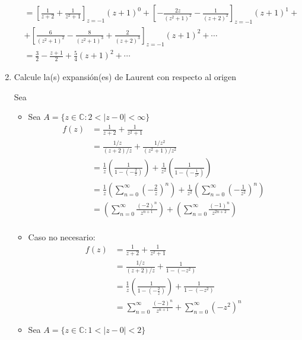 \begin{problema}
\begin{enumerate}
\begin{sol}
\begin{align*}
                &=\left[\frac{1}{z+2}+\frac{1}{z^2+1}\right]_{z=-1}(z+1)^0+\left[-\frac{2z}{(z^2+1)^2}-\frac{1}{(z+2)^2}\right]_{z=-1}(z+1)^1+\\
                &+ \left[\frac{6}{(z^2+1)^2}-\frac{8}{(z^2+1)^3}+\frac{2}{(z+2)^3}\right]_{z=-1}(z+1)^2+\cdots\\
                &= \frac{3}{2}-\frac{z+1}{2}+\frac{5}{4}(z+1)^2+\cdots
            \end{align*}
        \end{sol}
        \item Calcule la(s) expansión(es) de Laurent con respecto al origen
        \begin{sol}
            Sea 
            \begin{itemize}
                \item Sea $A=\{z\in\mathbb{C}: 2<|z-0|<\infty\}$
                 \begin{align*}
                    f(z) &= \frac{1}{z+2}+\frac{1}{z^2+1}\\
                         &= \frac{1\big/z}{(z+2)\big/ z}+\frac{1\big/z^2}{(z^2+1)\big/ z^2}\\
                         &= \frac{1}{z}\left(\frac{1}{1-\left(-\frac{2}{z}\right)}\right)+\frac{1}{z^2}\left(\frac{1}{1-\left(-\frac{1}{z^2}\right)}\right)\\
                         &=\frac{1}{z}\left(\sum_{n=0}^\infty \left(-\frac{2}{z}\right)^n\right)+\frac{1}{z^2}\left(\sum_{n=0}^\infty\left(-\frac{1}{z^2}\right)^n\right)\\
                         &= \left(\sum_{n=0}^\infty \frac{(-2)^n}{z^{n+1}}\right)+\left(\sum_{n=0}^\infty\frac{(-1)^n}{z^{2n+2}}\right)\\
                \end{align*}
                \item Caso no necesario:
                \begin{align*}
                    f(z) &= \frac{1}{z+2}+\frac{1}{z^2+1}\\
                         &= \frac{1\big/z}{(z+2)\big/ z} + \frac{1}{1-(-z^2)}\\
                         &= \frac{1}{z}\left(\frac{1}{1-\left(-\frac{2}{z}\right)}\right) + \frac{1}{1-(-z^2)}\\
                         &= \sum_{n=0}^\infty \frac{(-2)^n}{z^{n+1}}+\sum_{n=0}^\infty(-z^2)^n
                \end{align*}
                \item Sea $A=\{z\in\mathbb{C}: 1<|z-0|<2\}$

\end{itemize}
\end{sol}
\end{enumerate}
\end{problema}
